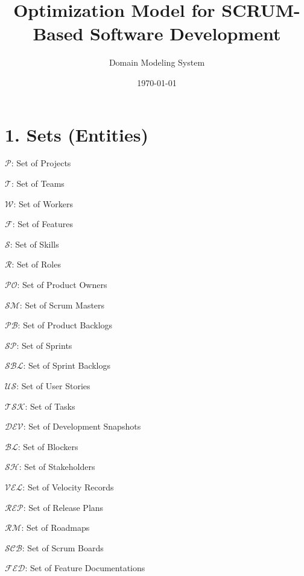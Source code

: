 \documentclass[12pt]{article}
\title{Optimization Model for SCRUM-Based Software Development}
\author{Domain Modeling System}
\date{\today}
\begin{document}
\maketitle
\tableofcontents
\newpage

\section{1. Sets (Entities)}
\item $\mathcal{P}$: Set of Projects
    \item $\mathcal{T}$: Set of Teams
    \item $\mathcal{W}$: Set of Workers
    \item $\mathcal{F}$: Set of Features
    \item $\mathcal{S}$: Set of Skills
    \item $\mathcal{R}$: Set of Roles
    \item $\mathcal{PO}$: Set of Product Owners
    \item $\mathcal{SM}$: Set of Scrum Masters
    \item $\mathcal{PB}$: Set of Product Backlogs
    \item $\mathcal{SP}$: Set of Sprints
    \item $\mathcal{SBL}$: Set of Sprint Backlogs
    \item $\mathcal{US}$: Set of User Stories
    \item $\mathcal{TSK}$: Set of Tasks
    \item $\mathcal{DEV}$: Set of Development Snapshots
    \item $\mathcal{BL}$: Set of Blockers
    \item $\mathcal{SH}$: Set of Stakeholders
    \item $\mathcal{VEL}$: Set of Velocity Records
    \item $\mathcal{REP}$: Set of Release Plans
    \item $\mathcal{RM}$: Set of Roadmaps
    \item $\mathcal{SCB}$: Set of Scrum Boards
    \item $\mathcal{FED}$: Set of Feature Documentations
\end{document}
